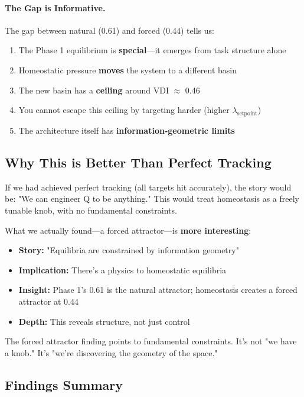 \paragraph{The Gap is Informative.}
The gap between natural (0.61) and forced (0.44) tells us:
\begin{enumerate}
\item The Phase 1 equilibrium is \textbf{special}—it emerges from task structure alone
\item Homeostatic pressure \textbf{moves} the system to a different basin
\item The new basin has a \textbf{ceiling} around VDI $\approx$ 0.46
\item You cannot escape this ceiling by targeting harder (higher $\lambda_{\text{setpoint}}$)
\item The architecture itself has \textbf{information-geometric limits}
\end{enumerate}

\subsection{Why This is Better Than Perfect Tracking}

If we had achieved perfect tracking (all targets hit accurately), the story would be: "We can engineer Q to be anything." This would treat homeostasis as a freely tunable knob, with no fundamental constraints.

What we actually found—a forced attractor—is \textbf{more interesting}:
\begin{itemize}
\item \textbf{Story:} "Equilibria are constrained by information geometry"
\item \textbf{Implication:} There's a physics to homeostatic equilibria
\item \textbf{Insight:} Phase 1's 0.61 is the natural attractor; homeostasis creates a forced attractor at 0.44
\item \textbf{Depth:} This reveals structure, not just control
\end{itemize}

The forced attractor finding points to fundamental constraints. It's not "we have a knob." It's "we're discovering the geometry of the space."

\subsection{Findings Summary}

